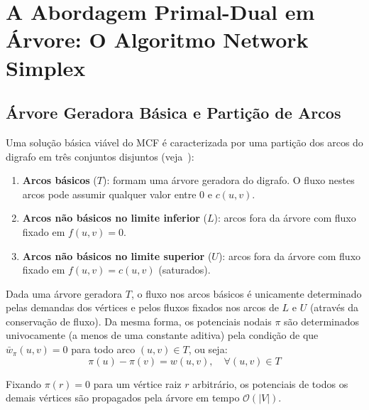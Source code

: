\chapter{A Abordagem Primal-Dual em Árvore: O Algoritmo Network Simplex}\label{sec:network_simplex}

\section{Árvore Geradora Básica e Partição de Arcos}

Uma solução básica viável do MCF é caracterizada por uma partição dos arcos do digrafo em três conjuntos disjuntos (veja~\cite{ahuja1993network}):
\begin{enumerate}
    \item \textbf{Arcos básicos} ($T$): formam uma árvore geradora do digrafo. O fluxo nestes arcos pode assumir qualquer valor entre $0$ e $c(u,v)$.
    \item \textbf{Arcos não básicos no limite inferior} ($L$): arcos fora da árvore com fluxo fixado em $f(u,v) = 0$.
    \item \textbf{Arcos não básicos no limite superior} ($U$): arcos fora da árvore com fluxo fixado em $f(u,v) = c(u,v)$ (saturados).
\end{enumerate}

Dada uma árvore geradora $T$, o fluxo nos arcos básicos é unicamente determinado pelas demandas dos vértices e pelos fluxos fixados nos arcos de $L$ e $U$ (através da conservação de fluxo). Da mesma forma, os potenciais nodais $\pi$ são determinados univocamente (a menos de uma constante aditiva) pela condição de que $\bar{w}_\pi(u,v) = 0$ para todo arco $(u,v) \in T$, ou seja:
\begin{equation}
    \pi(u) - \pi(v) = w(u,v), \quad \forall (u,v) \in T
\end{equation}

Fixando $\pi(r) = 0$ para um vértice raiz $r$ arbitrário, os potenciais de todos os demais vértices são propagados pela árvore em tempo $\mathcal{O}(|V|)$.

